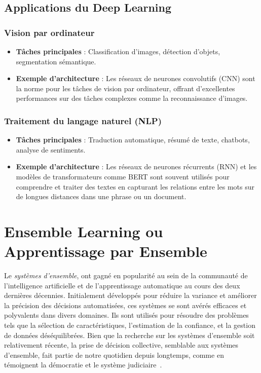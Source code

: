 \subsection{Applications du Deep Learning}

\subsubsection*{Vision par ordinateur}

\begin{itemize}
	\item \textbf{Tâches principales} : Classification d'images, détection d'objets, segmentation sémantique.
	\item \textbf{Exemple d'architecture} : Les réseaux de neurones convolutifs (CNN) sont la norme pour les tâches de vision par ordinateur, offrant d'excellentes performances sur des tâches complexes comme la reconnaissance d'images.
\end{itemize}

\subsubsection*{Traitement du langage naturel (NLP)}

\begin{itemize}
	\item \textbf{Tâches principales} : Traduction automatique, résumé de texte, chatbots, analyse de sentiments.
	\item \textbf{Exemple d'architecture} : Les réseaux de neurones récurrents (RNN) et les modèles de transformateurs comme BERT sont souvent utilisés pour comprendre et traiter des textes en capturant les relations entre les mots sur de longues distances dans une phrase ou un document.
\end{itemize}

\section{Ensemble Learning ou Apprentissage par Ensemble}
Le \textit{systèmes d'ensemble}, ont gagné en popularité au sein de la communauté de l'intelligence artificielle et de l'apprentissage automatique au cours des deux dernières décennies. Initialement développés pour réduire la variance et améliorer la précision des décisions automatisées, ces systèmes se sont avérés efficaces et polyvalents dans divers domaines. Ils sont utilisés pour résoudre des problèmes tels que la sélection de caractéristiques, l'estimation de la confiance, et la gestion de données déséquilibrées. Bien que la recherche sur les systèmes d'ensemble soit relativement récente, la prise de décision collective, semblable aux systèmes d'ensemble, fait partie de notre quotidien depuis longtemps, comme en témoignent la démocratie et le système judiciaire~\cite{polikar2012ensemble}.

